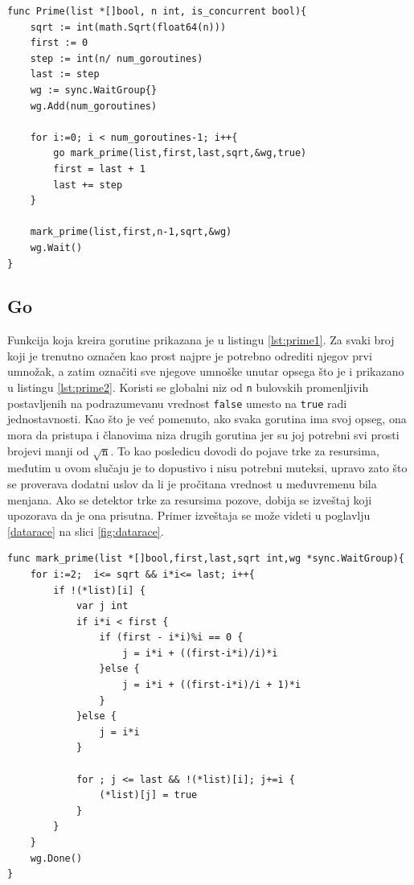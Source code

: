 \documentclass[12pt,oneside]{memoir}
\begin{document}
\begin{center}
\begin{lstlisting}[caption=Implementacija konkurentne funkcije za određivanje prostih brojeva manjih od n u jeziku Go,label={lst:prime1},backgroundcolor=\color{background}]
func Prime(list *[]bool, n int, is_concurrent bool){
	sqrt := int(math.Sqrt(float64(n)))
	first := 0
	step := int(n/ num_goroutines)
	last := step
	wg := sync.WaitGroup{}
	wg.Add(num_goroutines)

	for i:=0; i < num_goroutines-1; i++{
		go mark_prime(list,first,last,sqrt,&wg,true)
		first = last + 1
		last += step
	}

	mark_prime(list,first,n-1,sqrt,&wg)
	wg.Wait()
}
\end{lstlisting}
\end{center}

\subsection{Go}
Funkcija koja kreira gorutine prikazana je u listingu \ref{lst:prime1}. Za svaki broj koji je trenutno označen kao prost najpre je potrebno odrediti njegov prvi umnožak, a zatim označiti sve njegove umnoške unutar opsega što je i prikazano u listingu \ref{lst:prime2}. Koristi se globalni niz od \texttt{n} bulovskih promenljivih postavljenih na podrazumevanu vrednost \texttt{false} umesto na \texttt{true} radi jednostavnosti. Kao što je već pomenuto, ako svaka gorutina ima svoj opseg, ona mora da pristupa i članovima niza drugih gorutina jer su joj potrebni svi prosti brojevi manji od $\sqrt{\texttt{n}}$. To kao posledicu dovodi do pojave trke za resursima, međutim u ovom slučaju je to dopustivo i nisu potrebni muteksi, upravo zato što se proverava dodatni uslov da li je pročitana vrednost u međuvremenu bila menjana. Ako se detektor trke za resursima pozove, dobija se izveštaj koji upozorava da je ona prisutna. Primer izveštaja se može videti u poglavlju \ref{datarace} na slici \ref{fig:datarace}. 

\begin{center}
\begin{lstlisting}[caption=Implementacija konkurentne funkcije za označavanje prostih brojeva u jeziku Go,label={lst:prime2}, backgroundcolor=\color{background}]
func mark_prime(list *[]bool,first,last,sqrt int,wg *sync.WaitGroup){
	for i:=2;  i<= sqrt && i*i<= last; i++{
		if !(*list)[i] {
			var j int
			if i*i < first {
				if (first - i*i)%i == 0 {
					j = i*i + ((first-i*i)/i)*i
				}else {
					j = i*i + ((first-i*i)/i + 1)*i
				}
			}else {
				j = i*i
			}
		
			for ; j <= last && !(*list)[i]; j+=i {
				(*list)[j] = true
			}
		}
	}
	wg.Done()
}
\end{lstlisting}
\end{center}
\end{document}
